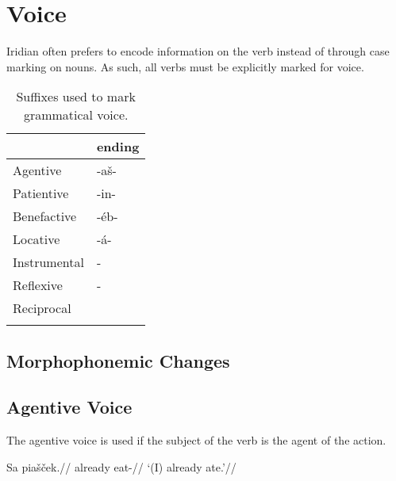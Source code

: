 \section{Voice}

Iridian often prefers to encode information on the verb instead of through case marking on nouns. As such, all verbs must be explicitly marked for voice.
\begin{table}[h!]
	\small
	\caption{Suffixes used to mark grammatical voice.}\medskip
	\begin{tabu} to 0.8\textwidth{YM}
		\toprule
		&{\sc ending}\\
		\midrule
		Agentive	& -aš-\\ \addlinespace
		Patientive	& -in-\\ \addlinespace
		Benefactive	& -éb-\\ \addlinespace
		Locative	& -á-\\ \addlinespace
		Instrumental& -\\ \addlinespace
		Reflexive	& -\\ \addlinespace
		Reciprocal	& \\ \addlinespace
		\bottomrule
	\end{tabu}
\end{table}

\subsection{Morphophonemic Changes}


\subsection{Agentive Voice}
\par The agentive voice is used if the subject of the verb is the agent of the action.

\pex
\begingl
\gla Sa piašček.//
\glb already eat-\Av{}\Pf{}//
\glft `(I) already ate.'//
\endgl
\xe

